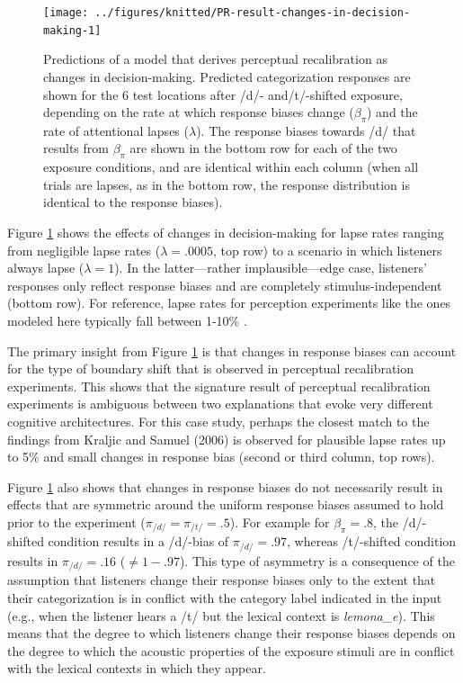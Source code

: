 \documentclass[
  11pt,
  man,floatsintext]{apa6}
\begin{document}
\begin{figure}

{\centering \texttt{[image: ../figures/knitted/PR-result-changes-in-decision-making-1]} 

}

\caption{Predictions of a model that derives perceptual recalibration as changes in decision-making. Predicted categorization responses are shown for the 6 test locations after /d/- and/t/-shifted exposure, depending on the rate at which response biases change (\(\beta_{\pi}\)) and the rate of attentional lapses (\(\lambda\)). The response biases towards /d/ that results from \(\beta_{\pi}\) are shown in the bottom row for each of the two exposure conditions, and are identical within each column (when all trials are lapses, as in the bottom row, the response distribution is identical to the response biases).}\label{fig:PR-result-changes-in-decision-making}
\end{figure}

Figure \ref{fig:PR-result-changes-in-decision-making} shows the effects of changes in decision-making for lapse rates ranging from negligible lapse rates (\(\lambda = .0005\), top row) to a scenario in which listeners always lapse (\(\lambda = 1\)). In the latter---rather implausible---edge case, listeners' responses only reflect response biases and are completely stimulus-independent (bottom row). For reference, lapse rates for perception experiments like the ones modeled here typically fall between 1-10\% \autocites[e.g.,][ constrained lapse rates to be \(<5\)\%]{clayards2008}[ report a best-fitting value of 5\%]{kleinschmidt-jaeger2016cogsci}.

The primary insight from Figure \ref{fig:PR-result-changes-in-decision-making} is that changes in response biases can account for the type of boundary shift that is observed in perceptual recalibration experiments. This shows that the signature result of perceptual recalibration experiments is ambiguous between two explanations that evoke very different cognitive architectures. For this case study, perhaps the closest match to the findings from Kraljic and Samuel (2006) is observed for plausible lapse rates up to 5\% and small changes in response bias (second or third column, top rows).

Figure \ref{fig:PR-result-changes-in-decision-making} also shows that changes in response biases do not necessarily result in effects that are symmetric around the uniform response biases assumed to hold prior to the experiment (\(\pi_{/d/}=\pi_{/t/}=.5\)). For example for \(\beta_{\pi} = .8\), the /d/-shifted condition results in a /d/-bias of \(\pi_{/d/}=.97\), whereas /t/-shifted condition results in \(\pi_{/d/}=.16\) (\(\neq 1 - .97\)). This type of asymmetry is a consequence of the assumption that listeners change their response biases only to the extent that their categorization is in conflict with the category label indicated in the input (e.g., when the listener hears a /t/ but the lexical context is \emph{lemona\_e}). This means that the degree to which listeners change their response biases depends on the degree to which the acoustic properties of the exposure stimuli are in conflict with the lexical contexts in which they appear.
\end{document}
